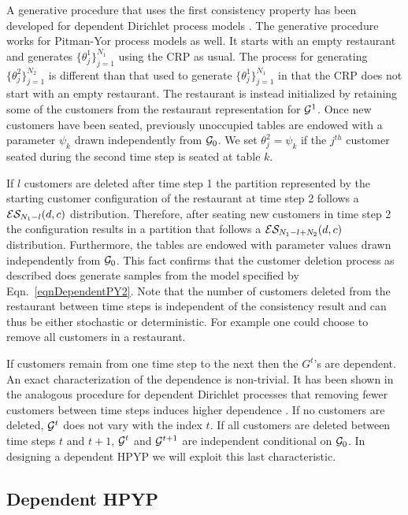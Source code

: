 A generative procedure that uses the first consistency property has been developed for dependent Dirichlet process models \cite{Caron2007}.  The generative procedure works for Pitman-Yor process models as well. It starts with an empty restaurant and generates $\{ \theta_j^1\}_{j= 1}^{N_1}$ using the CRP as usual.  The process for generating $\{ \theta_j^2\}_{j= 1}^{N_2}$ is different than that used to generate $\{ \theta_j^1\}_{j= 1}^{N_1}$ in that the CRP does not start with an empty restaurant.  The restaurant is instead initialized by retaining some of the customers from the restaurant representation for $\G^1$.  Once new customers have been seated, previously unoccupied tables are endowed with a parameter $\psi_k$ drawn independently from $\G_0$.  We set $\theta^2_j = \psi_k$ if  the $j^{th}$ customer seated during the second time step is seated at table $k$. 

If $l$ customers are deleted after time step 1 the partition represented by the starting customer configuration of the restaurant at time step 2 follows a $\ES_{N_1- l}(d,c)$ distribution.  Therefore, after seating new customers in time step 2 the configuration results in a partition that follows a $\ES_{N_1 - l + N_2}(d,c)$ distribution. Furthermore, the tables are endowed with parameter values drawn independently from $\G_0$.  This fact confirms that the customer deletion process as described does generate samples from the model specified by Eqn.~\ref{eqnDependentPY2}. Note that the number of customers deleted from the restaurant between time steps is independent of the consistency result and can thus be either stochastic or deterministic. For example one could choose to remove all customers in a restaurant.

If customers remain from one time step to the next then the $G^t$'s are dependent.  An exact characterization of the dependence is non-trivial.   It has been shown in the analogous procedure for dependent Dirichlet processes that removing fewer customers between time steps induces higher dependence \cite{Caron2007}.  If no customers are deleted, $\G^t$ does not vary with the index $t$.  If all customers are deleted between time steps $t$ and $t+1$,  $\G^t$ and $\G^{t+1}$ are independent conditional on $\G_0$.  In designing a dependent HPYP we will exploit this last characteristic.

\subsection{Dependent HPYP}
\label{sec:dhpyp}

